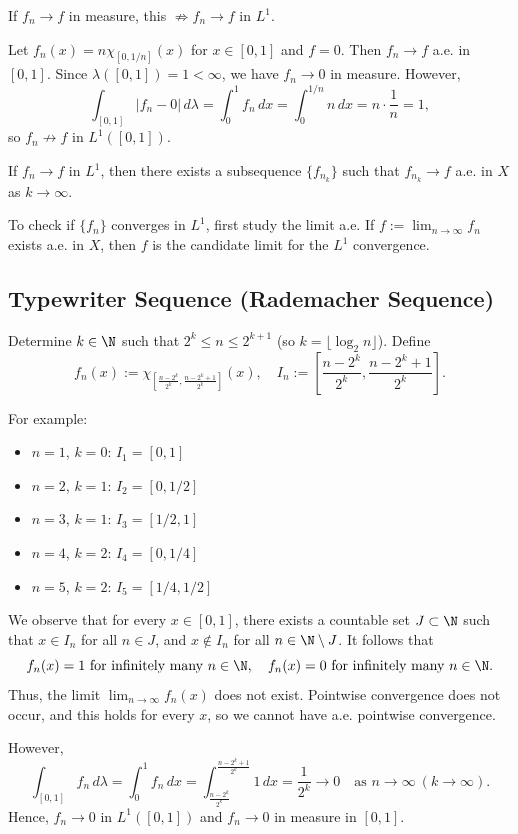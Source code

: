 \begin{remark}
If $f_n \to f$ in measure, this $\not\Rightarrow f_n \to f$ in $L^1$.
\end{remark}

\begin{example}
Let $f_n(x) = n \chi_{[0, 1/n]}(x)$ for $x \in [0,1]$ and $f = 0$. Then $f_n \to f$ a.e. in $[0,1]$. Since $\lambda([0,1]) = 1 < \infty$, we have $f_n \to 0$ in measure. However,
\[
\int_{[0,1]} |f_n - 0| \, d\lambda = \int_0^1 f_n \, dx = \int_0^{1/n} n \, dx = n \cdot \frac{1}{n} = 1,
\]
so $f_n \not\to f$ in $L^1([0,1])$.
\end{example}

\clearpage
\begin{corollary}
If $f_n \to f$ in $L^1$, then there exists a subsequence $\{f_{n_k}\}$ such that $f_{n_k} \to f$ a.e. in $X$ as $k \to \infty$.
\end{corollary}

\begin{remark}
To check if $\{f_n\}$ converges in $L^1$, first study the limit a.e. If $f := \lim_{n \to \infty} f_n$ exists a.e. in $X$, then $f$ is the candidate limit for the $L^1$ convergence.
\end{remark}

\subsection{Typewriter Sequence (Rademacher Sequence)}

Determine $k \in \N$ such that $2^k \leq n \leq 2^{k+1}$ (so $k = \lfloor \log_2 n \rfloor$). Define
\[
f_n(x) := \chi_{\left[\frac{n - 2^k}{2^k}, \frac{n - 2^k + 1}{2^k}\right]}(x), \quad I_n := \left[\frac{n - 2^k}{2^k}, \frac{n - 2^k + 1}{2^k}\right].
\]

For example:
\begin{itemize}
\item $n = 1$, $k = 0$: $I_1 = [0,1]$
\item $n = 2$, $k = 1$: $I_2 = [0, 1/2]$
\item $n = 3$, $k = 1$: $I_3 = [1/2, 1]$
\item $n = 4$, $k = 2$: $I_4 = [0, 1/4]$
\item $n = 5$, $k = 2$: $I_5 = [1/4, 1/2]$
\end{itemize}

We observe that for every $x \in [0,1]$, there exists a countable set $J \subset \N$ such that $x \in I_n$ for all $n \in J$, and $x \notin I_n$ for all $n \in \N \setminus J$. It follows that
\[
f_n(x) = 1 \text{ for infinitely many } n \in \N, \quad f_n(x) = 0 \text{ for infinitely many } n \in \N.
\]
Thus, the limit $\lim_{n \to \infty} f_n(x)$ does not exist. Pointwise convergence does not occur, and this holds for every $x$, so we cannot have a.e. pointwise convergence.

However,
\[
\int_{[0,1]} f_n \, d\lambda = \int_0^1 f_n \, dx = \int_{\frac{n - 2^k}{2^k}}^{\frac{n - 2^k + 1}{2^k}} 1 \, dx = \frac{1}{2^k} \to 0 \quad \text{as } n \to \infty \ (k \to \infty).
\]
Hence, $f_n \to 0$ in $L^1([0,1])$ and $f_n \to 0$ in measure in $[0,1]$.
